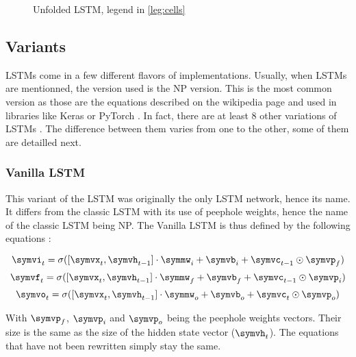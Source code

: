 \begin{figure}[H]
  \centering
  
  \caption{Unfolded \acs{LSTM}, legend in \cref{leg:cells}}
  \label{fig:lstmUse}
\end{figure}

\subsection{Variants}

\acp{LSTM} come in a few different flavors of implementations. Usually, when \acp{LSTM} are mentionned, the version used is the \ac{NP} version. This is the most common version as those are the equations described on the wikipedia page \cite{wikiLSTM} and used in libraries like Keras \cite{Keras} or PyTorch \cite{PyTorch}. In fact, there are at least 8 other variations of \acp{LSTM} \cite{nbLSTM}.
The difference between them varies from one to the other, some of them are detailled next.

\subsubsection{Vanilla \acs{LSTM}}
This variant of the \ac{LSTM} was originally the only \ac{LSTM} network, hence its name. It differs from the classic \ac{LSTM} with its use of peephole weights, hence the name of the classic \ac{LSTM} being \acl{NP}. The Vanilla \ac{LSTM} is thus defined by the following equations \cite{vanillaLSTM, nbLSTM} :

\begin{equation}\label{eq:inputGVanilla}
  \symvi_t=\sigma ([\symvx_{t},\symvh_{t-1}]\cdot \symmw_i + \symvb_i +\symvc_{t-1}\odot \symvp_f)
\end{equation}
\begin{equation}\label{eq:forgetGVanilla}
  \symvf_t=\sigma ([\symvx_{t},\symvh_{t-1}]\cdot \symmw_f + \symvb_f+\symvc_{t-1}\odot \symvp_i)
\end{equation}
\begin{equation}\label{eq:ouputGVanilla}
  \symvo_t=\sigma ([\symvx_{t},\symvh_{t-1}]\cdot \symmw_o + \symvb_o+\symvc_{t}\odot \symvp_o)
\end{equation}

With $\symvp_f$, $\symvp_i$ and $\symvp_o$ being the peephole weights vectors. Their size is the same as the size of the hidden state vector ($\symvh_t$).
The equations that have not been rewritten simply stay the same.

